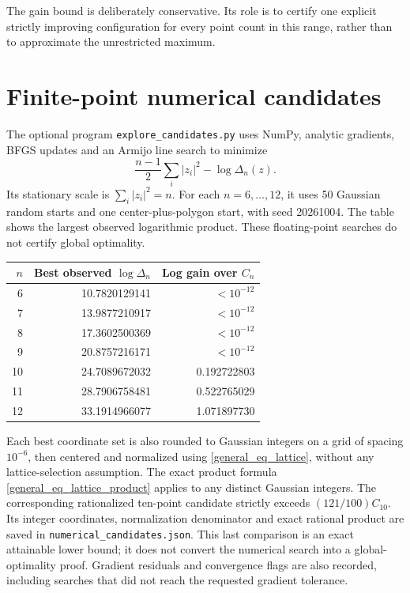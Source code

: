 \documentclass[11pt]{article}
\theoremstyle{remark}
\numberwithin{equation}{section}
\begin{document}
The gain bound is deliberately conservative. Its role is to certify
one explicit strictly improving configuration for every point count
in this range, rather than to approximate the unrestricted maximum.

\section{Finite-point numerical candidates}
The optional program \texttt{explore\_candidates.py} uses NumPy,
analytic gradients, BFGS updates and an Armijo line search to minimize
\[
 \frac{n-1}{2}\sum_i|z_i|^2-\log\Delta_n(z).
\]
Its stationary scale is $\sum_i|z_i|^2=n$.
For each $n=6,\ldots,12$, it uses 50 Gaussian random starts and
one center-plus-polygon start, with seed 20261004.
The table shows the largest observed logarithmic product.
These floating-point searches do not certify global optimality.

\begin{center}
\begin{tabular}{rrr}
\toprule
$n$ & Best observed $\log\Delta_n$ & Log gain over $C_n$\\
\midrule
6 & 10.7820129141 & $<10^{-12}$\\
7 & 13.9877210917 & $<10^{-12}$\\
8 & 17.3602500369 & $<10^{-12}$\\
9 & 20.8757216171 & $<10^{-12}$\\
10 & 24.7089672032 & 0.192722803\\
11 & 28.7906758481 & 0.522765029\\
12 & 33.1914966077 & 1.071897730\\
\bottomrule
\end{tabular}
\end{center}

Each best coordinate set is also rounded to Gaussian integers on
a grid of spacing $10^{-6}$, then centered and normalized using
\eqref{general_eq_lattice}, without any lattice-selection assumption.
The exact product formula \eqref{general_eq_lattice_product} applies
to any distinct Gaussian integers. The corresponding rationalized
ten-point candidate strictly exceeds $(121/100)C_{10}$.
Its integer coordinates, normalization denominator and exact rational
product are saved in \texttt{numerical\_candidates.json}.
This last comparison is an exact attainable lower bound; it does
not convert the numerical search into a global-optimality proof.
Gradient residuals and convergence flags are also recorded, including
searches that did not reach the requested gradient tolerance.
\end{document}
